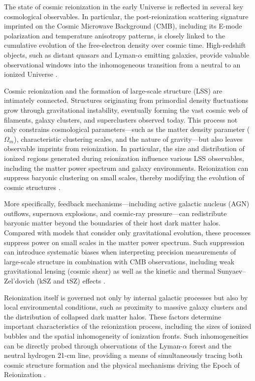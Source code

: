 The state of cosmic reionization in the early Universe is reflected in several key cosmological observables. In particular, the post-reionization scattering signature imprinted on the Cosmic Microwave Background (CMB), including its E-mode polarization and temperature anisotropy patterns, is closely linked to the cumulative evolution of the free-electron density over cosmic time. High-redshift objects, such as distant quasars and Lyman-$\alpha$ emitting galaxies, provide valuable observational windows into the inhomogeneous transition from a neutral to an ionized Universe \cite{smith2022}.

Cosmic reionization and the formation of large-scale structure (LSS) are intimately connected. Structures originating from primordial density fluctuations grow through gravitational instability, eventually forming the vast cosmic web of filaments, galaxy clusters, and superclusters observed today. This process not only constrains cosmological parameters---such as the matter density parameter ($\Omega_m$), characteristic clustering scales, and the nature of gravity---but also leaves observable imprints from reionization. In particular, the size and distribution of ionized regions generated during reionization influence various LSS observables, including the matter power spectrum and galaxy environments. Reionization can suppress baryonic clustering on small scales, thereby modifying the evolution of cosmic structures \cite{siegel2025}.

More specifically, feedback mechanisms---including active galactic nucleus (AGN) outflows, supernova explosions, and cosmic-ray pressure---can redistribute baryonic matter beyond the boundaries of their host dark matter halos. Compared with models that consider only gravitational evolution, these processes suppress power on small scales in the matter power spectrum. Such suppression can introduce systematic biases when interpreting precision measurements of large-scale structure in combination with CMB observations, including weak gravitational lensing (cosmic shear) as well as the kinetic and thermal Sunyaev--Zel'dovich (kSZ and tSZ) effects \cite{siegel2025}.

Reionization itself is governed not only by internal galactic processes but also by local environmental conditions, such as proximity to massive galaxy clusters and the distribution of collapsed dark matter halos. These factors determine important characteristics of the reionization process, including the sizes of ionized bubbles and the spatial inhomogeneity of ionization fronts. Such inhomogeneities can be directly probed through observations of the Lyman-$\alpha$ forest and the neutral hydrogen 21-cm line, providing a means of simultaneously tracing both cosmic structure formation and the physical mechanisms driving the Epoch of Reionization \cite{smith2022}.

